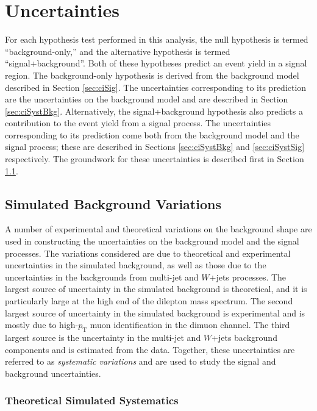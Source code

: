 \section{Uncertainties}\label{sec:ciSyst}

For each hypothesis test performed in this analysis, the null hypothesis is termed ``background-only,'' and the alternative hypothesis is termed ``signal+background''.
Both of these hypotheses predict an event yield in a signal region.
The background-only hypothesis is derived from the background model described in Section \ref{sec:ciSig}.
The uncertainties corresponding to its prediction are the uncertainties on the background model and are described in Section \ref{sec:ciSystBkg}.
Alternatively, the signal+background hypothesis also predicts a contribution to the event yield from a signal process.
The uncertainties corresponding to its prediction come both from the background model and the signal process; these are described in Sections \ref{sec:ciSystBkg} and \ref{sec:ciSystSig} respectively.
The groundwork for these uncertainties is described first in Section \ref{sec:ciSystVars}.

\subsection{Simulated Background Variations}\label{sec:ciSystVars}

A number of experimental and theoretical variations on the background shape are used in constructing the uncertainties on the background model and the signal processes.
The variations considered are due to theoretical and experimental uncertainties in the simulated background, as well as those due to the uncertainties in the backgrounds from multi-jet and $W$+jets processes.
The largest source of uncertainty in the simulated background is theoretical, and it is particularly large at the high end of the dilepton mass spectrum.
The second largest source of uncertainty in the simulated background is experimental and is mostly due to high-$p_\text{T}$ muon identification in the dimuon channel.
The third largest source is the uncertainty in the multi-jet and $W$+jets background components and is estimated from the data.
Together, these uncertainties are referred to as \emph{systematic variations} and are used to study the signal and background uncertainties.

\subsubsection{Theoretical Simulated Systematics}\label{sec:ciThySyst}


